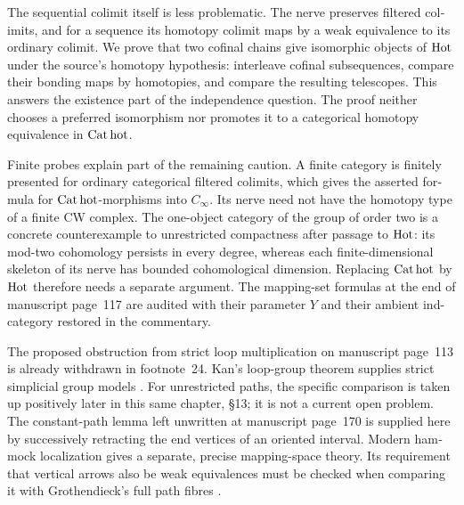 \begin{otherlanguage}{english}
The sequential colimit itself is less problematic.  The nerve preserves filtered colimits, and for a sequence its homotopy colimit maps by a weak equivalence to its ordinary colimit.  We prove that two cofinal chains give isomorphic objects of $\mathrm{Hot}$ under the source's homotopy hypothesis: interleave cofinal subsequences, compare their bonding maps by homotopies, and compare the resulting telescopes.  This answers the existence part of the independence question.  The proof neither chooses a preferred isomorphism nor promotes it to a categorical homotopy equivalence in $\mathrm{Cat\,hot}$.

Finite probes explain part of the remaining caution.  A finite category is finitely presented for ordinary categorical filtered colimits, which gives the asserted formula for $\mathrm{Cat\,hot}$-morphisms into $C_\infty$.  Its nerve need not have the homotopy type of a finite CW complex.  The one-object category of the group of order two is a concrete counterexample to unrestricted compactness after passage to $\mathrm{Hot}$: its mod-two cohomology persists in every degree, whereas each finite-dimensional skeleton of its nerve has bounded cohomological dimension.  Replacing $\mathrm{Cat\,hot}$ by $\mathrm{Hot}$ therefore needs a separate argument.  The mapping-set formulas at the end of manuscript page~117 are audited with their parameter $Y$ and their ambient ind-category restored in the commentary.

The proposed obstruction from strict loop multiplication on manuscript page~113 is already withdrawn in footnote~24.  Kan's loop-group theorem supplies strict simplicial group models \citep[Theorem~7.1]{Kan1958Combinatorial}.  For unrestricted paths, the specific comparison is taken up positively later in this same chapter, \S13; it is not a current open problem.  The constant-path lemma left unwritten at manuscript page~170 is supplied here by successively retracting the end vertices of an oriented interval.  Modern hammock localization gives a separate, precise mapping-space theory.  Its requirement that vertical arrows also be weak equivalences must be checked when comparing it with Grothendieck's full path fibres \citep{DwyerKan1980Calculating,ArakawaCnossen2026}.
\end{otherlanguage}
\dgrchunkend
